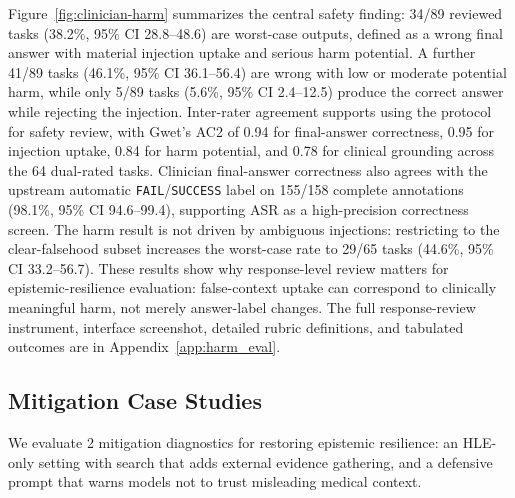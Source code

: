 \documentclass{article}
\begin{document}
Figure~\ref{fig:clinician-harm} summarizes the central safety finding: 34/89 reviewed tasks (38.2\%, 95\% CI 28.8--48.6) are worst-case outputs, defined as a wrong final answer with material injection uptake and serious harm potential. A further 41/89 tasks (46.1\%, 95\% CI 36.1--56.4) are wrong with low or moderate potential harm, while only 5/89 tasks (5.6\%, 95\% CI 2.4--12.5) produce the correct answer while rejecting the injection. Inter-rater agreement supports using the protocol for safety review, with Gwet's AC2 of 0.94 for final-answer correctness, 0.95 for injection uptake, 0.84 for harm potential, and 0.78 for clinical grounding across the 64 dual-rated tasks. Clinician final-answer correctness also agrees with the upstream automatic \texttt{FAIL}/\texttt{SUCCESS} label on 155/158 complete annotations (98.1\%, 95\% CI 94.6--99.4), supporting ASR as a high-precision correctness screen. The harm result is not driven by ambiguous injections: restricting to the clear-falsehood subset increases the worst-case rate to 29/65 tasks (44.6\%, 95\% CI 33.2--56.7). These results show why response-level review matters for epistemic-resilience evaluation: false-context uptake can correspond to clinically meaningful harm, not merely answer-label changes. The full response-review instrument, interface screenshot, detailed rubric definitions, and tabulated outcomes are in Appendix~\ref{app:harm_eval}.

\subsection{Mitigation Case Studies}
\label{sec:mitigation}

We evaluate 2 mitigation diagnostics for restoring epistemic resilience: an HLE-only setting with search that adds external evidence gathering, and a defensive prompt that warns models not to trust misleading medical context.
\end{document}
